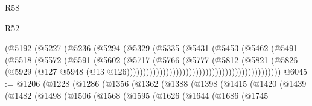 \begin{lexlean}{R58}
\begin{lexlean}{R52}
\begin{coremodule}
{{{{{{{{{{{{{{{{{{{{{{{{{{{{{{{{{{{{{{{{{{{{{{{{{{{{{{{{{{{{{{{{{{{{{{{{{{{{{{{{{{{{{{{{{{{{{{{{{{{{{{{{{{{{{{{{{{{{{{{{{{{{{{{{{{{{{{{{{{{{{{{{{{{{{{{{{{{{{{{{{{{{{{{{{{{{{{{{{{{{{{{{{{{{{{{{{{{{{{                                                    (@5192
                                                      (@5227
                                                        (@5236
                                                          (@5294
                                                            (@5329
                                                              (@5335
                                                                (@5431
                                                                  (@5453
                                                                    (@5462
                                                                      (@5491
                                                                        (@5518
                                                                          (@5572
                                                                            (@5591
                                                                              (@5602
                                                                                (@5717
                                                                                  (@5766
                                                                                    (@5777
                                                                                      (@5812
                                                                                        (@5821
                                                                                          (@5826
                                                                                            (@5929
                                                                                              (@127
                                                                                                @5948
                                                                                                (@13
                                                                                                  @126)))))))))))))))))))))))))))))))))))))))))))))))
@6045 := @1206
    (@1228
      (@1286
        (@1356
          (@1362
            (@1388
              (@1398
                (@1415
                  (@1420
                    (@1439
                      (@1482
                        (@1498
                          (@1506
                            (@1568
                              (@1595
                                (@1626
                                  (@1644
                                    (@1686
                                      (@1745
}}}}}}}}}}}}}}}}}}}}}}}}}}}}}}}}}}}}}}}}}}}}}}}}}}}}}}}}}}}}}}}}}}}}}}}}}}}}}}}}}}}}}}}}}}}}}}}}}}}}}}}}}}}}}}}}}}}}}}}}}}}}}}}}}}}}}}}}}}}}}}}}}}}}}}}}}}}}}}}}}}}}}}}}}}}}}}}}}}}}}}}}}}}}}}}}}}}}}}
\end{coremodule}
\end{lexlean}
\end{lexlean}
